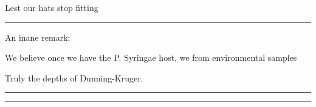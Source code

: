 \documentclass[paper.tex]{subfiles}
\begin{document}
Lest our hats stop fitting

\rule{\linewidth}{0.2pt}

An inane remark:

\begin{displayquote}
We believe once we have the P. Syringae host, we from environmental samples
\end{displayquote}

Truly the depths of Dunning-Kruger.

\rule{\linewidth}{0.2pt}
%
%
%
%
%
%
%
%

\rule{\linewidth}{0.2pt}


\end{document}
